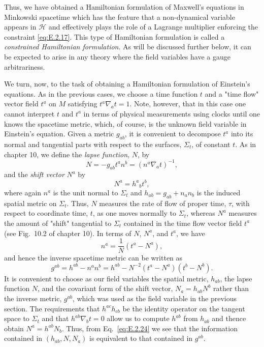 Thus, we have obtained a Hamiltonian formulation of Maxwell's equations in
Minkowski spacetime which has the feature that a non-dynamical variable appears in
\(\mathcal H\) and effectively plays the role of a Lagrange multiplier enforcing the
constraint \eqref{eq:E.2.17}. This type of Hamiltonian formulation is called a
\emph{constrained Hamiltonian formulation}. As will be discussed further below, it
can be expected to arise in any theory where the field variables have a gauge
arbitrariness.

We turn, now, to the task of obtaining a Hamiltonian formulation of Einstein's
equations. As in the previous cases, we choose a time function \(t\) and a "time
flow" vector field \(t^a\) on \(M\) satisfying \(t^a\nabla_at=1\). Note, however,
that in this case one cannot interpret \(t\) and \(t^a\) in terms of physical
measurements using clocks until one knows the spacetime metric, which, of course,
is the unknown field variable in Einstein's equation. Given a metric \(g_{ab}\), it
is convenient to decompose \(t^a\) into its normal and tangential parts with respect
to the surfaces, \(\Sigma_t\), of constant \(t\). As in chapter 10, we define the
\emph{lapse function}, \(N\), by
\begin{equation}
  N=-g_{ab}t^an^b=(n^a\nabla_at)^{-1},
  \tag{E.2.21}\label{eq:E.2.21}
\end{equation}
and the \emph{shift vector} \(N^a\) by
\begin{equation}
  N^a=h^a{}_bt^b,
  \tag{E.2.22}\label{eq:E.2.22}
\end{equation}
where again \(n^a\) is the unit normal to \(\Sigma_t\) and
\(h_{ab}=g_{ab}+n_an_b\) is the induced spatial metric on \(\Sigma_t\). Thus,
\(N\) measures the rate of flow of proper time, \(\tau\), with respect to coordinate
time, \(t\), as one moves normally to \(\Sigma_t\), whereas \(N^a\) measures the
amount of "shift" tangential to \(\Sigma_t\) contained in the time flow vector field
\(t^a\) (see Fig.~10.2 of chapter 10). In terms of \(N\), \(N^a\), and \(t^a\), we
have
\begin{equation}
  n^a=\frac{1}{N}(t^a-N^a),
  \tag{E.2.23}\label{eq:E.2.23}
\end{equation}
and hence the inverse spacetime metric can be written as
\begin{equation}
  g^{ab}=h^{ab}-n^an^b
    =h^{ab}-N^{-2}(t^a-N^a)(t^b-N^b).
  \tag{E.2.24}\label{eq:E.2.24}
\end{equation}
It is convenient to choose as our field variables the spatial metric, \(h_{ab}\), the
lapse function \(N\), and the covariant form of the shift vector,
\(N_a=h_{ab}N^b\) rather than the inverse metric, \(g^{ab}\), which was used as the
field variable in the previous section. The requirements that \(h^{ac}h_{cb}\) be
the identity operator on the tangent space to \(\Sigma_t\) and that
\(h^{ab}\nabla_bt=0\) allow us to compute \(h^{ab}\) from \(h_{ab}\) and thence
obtain \(N^a=h^{ab}N_b\). Thus, from Eq.~\eqref{eq:E.2.24} we see that the
information contained in \((h_{ab},N,N_a)\) is equivalent to that contained in
\(g^{ab}\).

